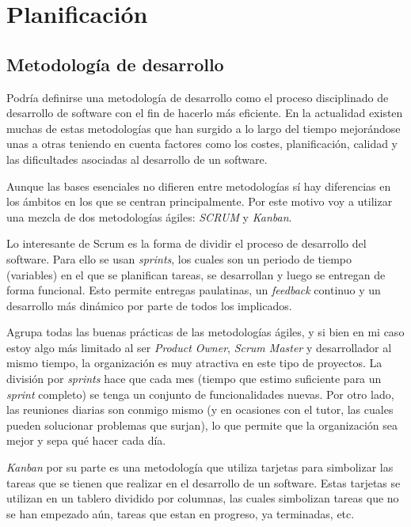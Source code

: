 \chapter{Planificación}

\section{Metodología de desarrollo}

Podría definirse una metodología de desarrollo como el proceso disciplinado de desarrollo de software con el fin de hacerlo más eficiente. En la actualidad existen muchas de estas metodologías que han surgido a lo largo del tiempo mejorándose unas a otras teniendo en cuenta factores como los costes, planificación, calidad y las dificultades asociadas al desarrollo de un software.

Aunque las bases esenciales no difieren entre metodologías sí hay diferencias en los ámbitos en los que se centran principalmente. Por este motivo voy a utilizar una mezcla de dos metodologías ágiles: \textit{SCRUM} y \textit{Kanban}.

Lo interesante de Scrum es la forma de dividir el proceso de desarrollo del software. Para ello se usan \textit{sprints}, los cuales son un periodo de tiempo (variables) en el que se planifican tareas, se desarrollan y luego se entregan de forma funcional. Esto permite entregas paulatinas, un \textit{feedback} continuo y un desarrollo más dinámico por parte de todos los implicados.

Agrupa todas las buenas prácticas de las metodologías ágiles, y si bien en mi caso estoy algo más limitado al ser \textit{Product Owner}, \textit{Scrum Master} y desarrollador al mismo tiempo, la organización es muy atractiva en este tipo de proyectos. La división por \textit{sprints} hace que cada mes (tiempo que estimo suficiente para un \textit{sprint} completo) se tenga un conjunto de funcionalidades nuevas. Por otro lado, las reuniones diarias son conmigo mismo (y en ocasiones con el tutor, las cuales pueden solucionar problemas que surjan), lo que permite que la organización sea mejor y sepa qué hacer cada día.

\textit{Kanban} por su parte es una metodología que utiliza tarjetas para simbolizar las tareas que se tienen que realizar en el desarrollo de un software. Estas tarjetas se utilizan en un tablero dividido por columnas, las cuales simbolizan tareas que no se han empezado aún, tareas que estan en progreso, ya terminadas, etc.

